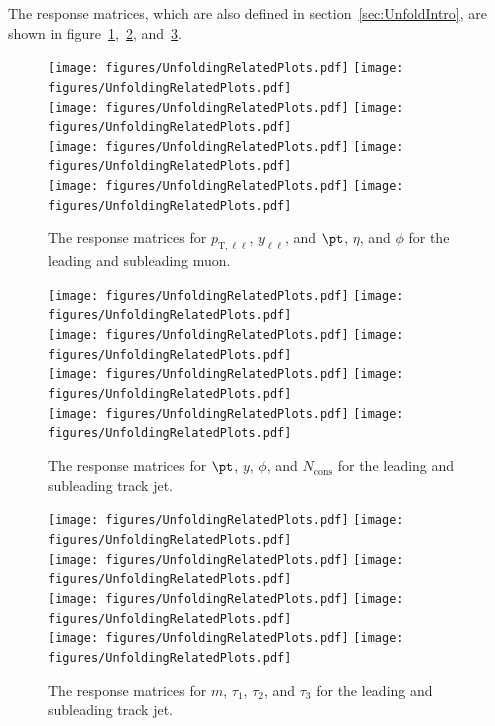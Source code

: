 The response matrices, which are also defined in section~\ref{sec:UnfoldIntro}, are shown in figure~\ref{fig:migMatDilep},~\ref{fig:migMatTJ1}, and~\ref{fig:migMatTJ2}.

\begin{figure}[h!]
  \centering
  \texttt{[image: figures/UnfoldingRelatedPlots.pdf]}
  \texttt{[image: figures/UnfoldingRelatedPlots.pdf]} \\
  \texttt{[image: figures/UnfoldingRelatedPlots.pdf]}
  \texttt{[image: figures/UnfoldingRelatedPlots.pdf]} \\
  \texttt{[image: figures/UnfoldingRelatedPlots.pdf]}
  \texttt{[image: figures/UnfoldingRelatedPlots.pdf]} \\
  \texttt{[image: figures/UnfoldingRelatedPlots.pdf]}
  \texttt{[image: figures/UnfoldingRelatedPlots.pdf]}
  \caption{The response matrices for $p_{\text{T},\ell\ell}$, $y_{\ell\ell}$, and $\pt$, $\eta$, and $\phi$ for the leading and subleading muon.}
  \label{fig:migMatDilep}
\end{figure}

\begin{figure}[h!]
  \centering
  \texttt{[image: figures/UnfoldingRelatedPlots.pdf]}
  \texttt{[image: figures/UnfoldingRelatedPlots.pdf]} \\
  \texttt{[image: figures/UnfoldingRelatedPlots.pdf]}
  \texttt{[image: figures/UnfoldingRelatedPlots.pdf]} \\
  \texttt{[image: figures/UnfoldingRelatedPlots.pdf]}
  \texttt{[image: figures/UnfoldingRelatedPlots.pdf]} \\
  \texttt{[image: figures/UnfoldingRelatedPlots.pdf]}
  \texttt{[image: figures/UnfoldingRelatedPlots.pdf]}
  \caption{The response matrices for $\pt$, $y$, $\phi$, and $N_{\text{cons}}$ for the leading and subleading track jet.}
  \label{fig:migMatTJ1}
\end{figure}

\begin{figure}[h!]
  \centering
  \texttt{[image: figures/UnfoldingRelatedPlots.pdf]}
  \texttt{[image: figures/UnfoldingRelatedPlots.pdf]} \\
  \texttt{[image: figures/UnfoldingRelatedPlots.pdf]}
  \texttt{[image: figures/UnfoldingRelatedPlots.pdf]} \\
  \texttt{[image: figures/UnfoldingRelatedPlots.pdf]}
  \texttt{[image: figures/UnfoldingRelatedPlots.pdf]} \\
  \texttt{[image: figures/UnfoldingRelatedPlots.pdf]}
  \texttt{[image: figures/UnfoldingRelatedPlots.pdf]}
  \caption{The response matrices for $m$, $\tau_1$, $\tau_2$, and $\tau_3$ for the leading and subleading track jet.}
  \label{fig:migMatTJ2}
\end{figure}

